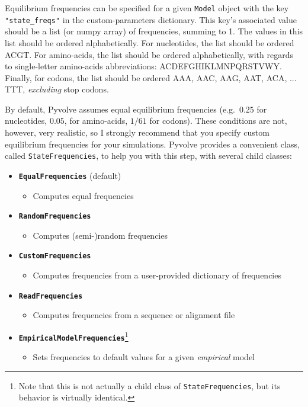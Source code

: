 \documentclass{article}
\newcommand{\code}[1]{\texttt{\small{#1}}}
\begin{document}
Equilibrium frequencies can be specified for a given \code{Model} object with the key \code{"state\_freqs"} in the custom-parameters dictionary. This key's associated value should be a list (or numpy array) of frequencies, summing to 1. The values in this list should be ordered alphabetically. For nucleotides, the list should be ordered ACGT. For amino-acids, the list should be ordered alphabetically, with regards to single-letter amino-acids abbreviations: ACDEFGHIKLMNPQRSTVWY. Finally, for codons, the list should be ordered AAA, AAC, AAG, AAT, ACA, ... TTT, \emph{excluding} stop codons.

By default, Pyvolve assumes equal equilibrium frequencies (e.g.\ $0.25$ for nucleotides, $0.05$, for amino-acids, $1/61$ for codons). These conditions are not, however, very realistic, so I strongly recommend that you specify custom equilibrium frequencies for your simulations. Pyvolve provides a convenient class, called \code{StateFrequencies}, to help you with this step, with several child classes:
\begin{itemize}
	\item \code{\textbf{EqualFrequencies}} (default)
	\begin{itemize}
		\item Computes equal frequencies 
	\end{itemize}
	
	\item \code{\textbf{RandomFrequencies}}
	\begin{itemize}
		\item Computes (semi-)random frequencies
	\end{itemize}
	
	\item \code{\textbf{CustomFrequencies}}
	\begin{itemize}
		\item Computes frequencies from a user-provided dictionary of frequencies
	\end{itemize}
	
	\item \code{\textbf{ReadFrequencies}}
	\begin{itemize}
		\item Computes frequencies from a sequence or alignment file
	\end{itemize}
	
	\item \code{\textbf{EmpiricalModelFrequencies}}\footnote{Note that this is not actually a child class of \code{StateFrequencies}, but its behavior is virtually identical.}
	\begin{itemize}
		\item Sets frequencies to default values for a given \emph{empirical} model		
	\end{itemize}
\end{itemize}
\end{document}
